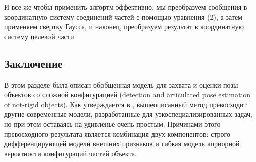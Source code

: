 И все же чтобы применить алгортм эффективно, мы преобразуем сообщения в координатную систему соединений частей с помощью уравнения (2), а затем применяем свертку Гаусса, и наконец, преобразуем результат в координатную систему целевой части.

\subsection{Заключение}

В этом разделе была описан обобщенная модель для захвата и оценки позы объектов со сложной конфигурацией (detection and articulated pose estimation of not-rigid objects). Как утверждается в \cite{andriluka09}, вышеописанный метод превосходит другие современные модели, разработанные для узкоспециализированных задач, но при этом оставаясь на удивленье очень простым. Причинами этого превосходного результата является комбинация двух компонентов: строго дифференцирующей модели внешних признаков и гибкая модель априорной вероятности конфигураций частей объекта.

\newpage
